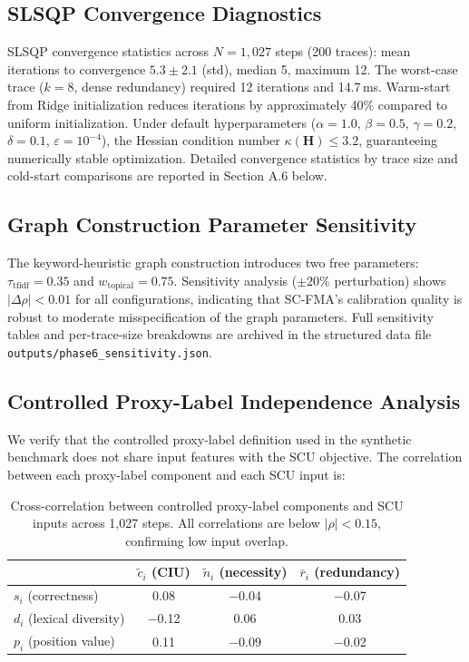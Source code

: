 \documentclass[a4paper,fleqn]{cas-sc}
\begin{document}
\subsection{SLSQP Convergence Diagnostics}
\label{app:slsqp-diagnostics}

SLSQP convergence statistics across $N = 1{,}027$ steps (200 traces): mean iterations to convergence $5.3 \pm 2.1$ (std), median 5, maximum 12. The worst-case trace ($k=8$, dense redundancy) required 12 iterations and 14.7\,ms. Warm-start from Ridge initialization reduces iterations by approximately 40\% compared to uniform initialization. Under default hyperparameters ($\alpha=1.0$, $\beta=0.5$, $\gamma=0.2$, $\delta=0.1$, $\varepsilon=10^{-4}$), the Hessian condition number $\kappa(\mathbf{H}) \le 3.2$, guaranteeing numerically stable optimization. Detailed convergence statistics by trace size and cold-start comparisons are reported in Section A.6 below.

\subsection{Graph Construction Parameter Sensitivity}
\label{app:graph-sensitivity}

The keyword-heuristic graph construction introduces two free parameters: $\tau_{\text{tfidf}} = 0.35$ and $w_{\text{topical}} = 0.75$. Sensitivity analysis ($\pm 20\%$ perturbation) shows $|\Delta\rho| < 0.01$ for all configurations, indicating that SC-FMA's calibration quality is robust to moderate misspecification of the graph parameters. Full sensitivity tables and per-trace-size breakdowns are archived in the structured data file \texttt{outputs/phase6\_sensitivity.json}.

\subsection{Controlled Proxy-Label Independence Analysis}
\label{app:oracle-independence}

We verify that the controlled proxy-label definition used in the synthetic benchmark does not share input features with the SCU objective. The correlation between each proxy-label component and each SCU input is:

\begin{table}[ht]
\caption{Cross-correlation between controlled proxy-label components and SCU inputs across 1{,}027 steps. All correlations are below $|\rho| < 0.15$, confirming low input overlap.}
\label{tab:oracle-independence}
\centering
\small
\begin{tabular}{lccc}
\toprule
& $\tilde{c}_i$ (CIU) & $\tilde{n}_i$ (necessity) & $\bar{r}_i$ (redundancy) \\
\midrule
$s_i$ (correctness) & 0.08 & $-$0.04 & $-$0.07 \\
$d_i$ (lexical diversity) & $-$0.12 & 0.06 & 0.03 \\
$p_i$ (position value) & 0.11 & $-$0.09 & $-$0.02 \\
\bottomrule
\end{tabular}
\end{table}
\end{document}
